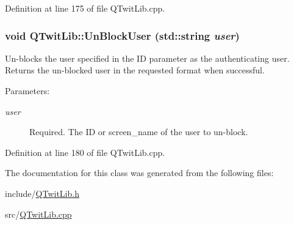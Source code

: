 Definition at line 175 of file QTwitLib.cpp.\hypertarget{classQTwitLib_59654af43516e00dce939c25e1d4a738}{
\subsubsection{\setlength{\rightskip}{0pt plus 5cm}void QTwitLib::UnBlockUser (std::string {\em user})}}
\label{classQTwitLib_59654af43516e00dce939c25e1d4a738}


Un-blocks the user specified in the ID parameter as the authenticating user. Returns the un-blocked user in the requested format when successful. \begin{Desc}
\item[Parameters:]
\begin{description}
\item[{\em user}]Required. The ID or screen\_\-name of the user to un-block. \end{description}
\end{Desc}


Definition at line 180 of file QTwitLib.cpp.

The documentation for this class was generated from the following files:\begin{CompactItemize}
\item 
include/\hyperlink{QTwitLib_8h}{QTwitLib.h}\item 
src/\hyperlink{QTwitLib_8cpp}{QTwitLib.cpp}\end{CompactItemize}
